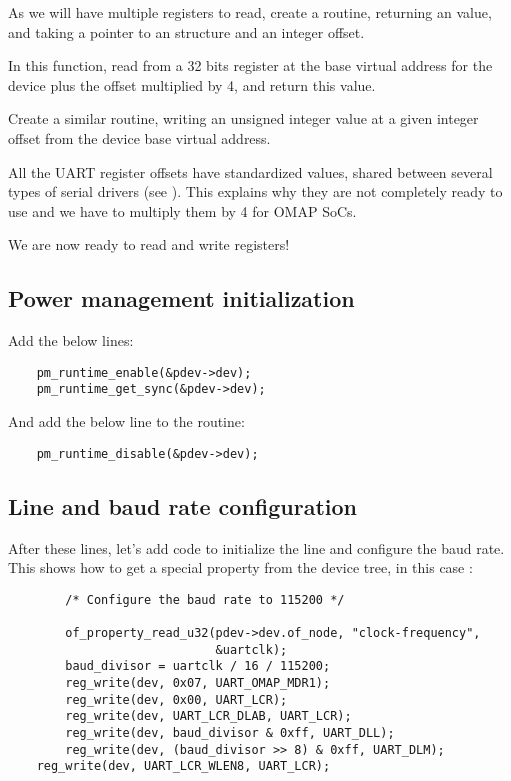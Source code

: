 As we will have multiple registers to read, create a 
routine, returning an  value, and  taking a 
pointer to an  structure and an  integer
offset.

In this function, read from a 32 bits register at the base virtual
address for the device plus the offset multiplied by 4, and return
this value.

Create a similar  routine, writing an unsigned
integer value at a given integer offset from the device base virtual
address.

All the UART register offsets have standardized values, shared between
several types of serial drivers (see
). This explains why they are not
completely ready to use and we have to multiply them by 4 for OMAP SoCs.

We are now ready to read and write registers!

\subsection{Power management initialization}

Add the below lines:

\begin{verbatim}
	pm_runtime_enable(&pdev->dev);
	pm_runtime_get_sync(&pdev->dev);
\end{verbatim}

And add the below line to the  routine:

\begin{verbatim}
	pm_runtime_disable(&pdev->dev);
\end{verbatim}

\subsection{Line and baud rate configuration}

After these lines, let's add code to initialize the line
and configure the baud rate. This shows how to get a special
property from the device tree, in this case :

\begin{verbatim}
        /* Configure the baud rate to 115200 */

        of_property_read_u32(pdev->dev.of_node, "clock-frequency",
                             &uartclk);
        baud_divisor = uartclk / 16 / 115200;
        reg_write(dev, 0x07, UART_OMAP_MDR1);
        reg_write(dev, 0x00, UART_LCR);
        reg_write(dev, UART_LCR_DLAB, UART_LCR);
        reg_write(dev, baud_divisor & 0xff, UART_DLL);
        reg_write(dev, (baud_divisor >> 8) & 0xff, UART_DLM);
	reg_write(dev, UART_LCR_WLEN8, UART_LCR);
\end{verbatim}

